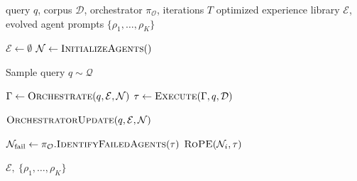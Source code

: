 
\begin{algorithm}[H]
\caption{\hero — Top Level}
\begin{algorithmic}[1]
\Require query $q$, corpus $\mathcal{D}$, orchestrator $\pi_{\mathcal{O}}$, iterations $T$
\Ensure optimized experience library $\mathcal{E}$, evolved agent prompts $\{\rho_1, \dots, \rho_K\}$

\State $\mathcal{E} \leftarrow \emptyset$
\State $\mathcal{N} \leftarrow \textsc{InitializeAgents}()$

    \State Sample query $q \sim \mathcal{Q}$

    \State $\Gamma \leftarrow \textsc{Orchestrate}(q, \mathcal{E}, \mathcal{N})$
    \State $\tau \leftarrow \textsc{Execute}(\Gamma, q, \mathcal{D})$

    \State $\textsc{OrchestratorUpdate}(q, \mathcal{E}, \mathcal{N})$

    \State $\mathcal{N}_{\text{fail}} \leftarrow \pi_{\mathcal{O}}.\textsc{IdentifyFailedAgents}(\tau)$
        \State $\textsc{RoPE}(\mathcal{N}_i, \tau)$
    \EndFor
\EndFor

\State \Return $\mathcal{E},\ \{\rho_1, \dots, \rho_K\}$
\end{algorithmic}
\end{algorithm}


